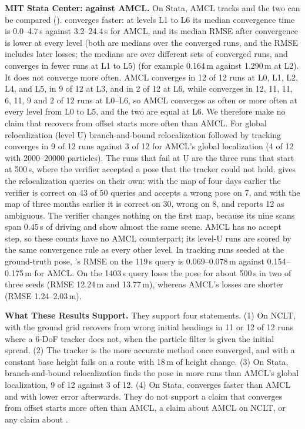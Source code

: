 \noindent\textbf{MIT Stata Center:  against AMCL.} On Stata, AMCL tracks and the two can be compared ().  converges faster: at levels L1 to L6 its median convergence time is 0.0--4.7\,s against 3.2--24.4\,s for AMCL, and its median RMSE after convergence is lower at every level (both are medians over the converged runs, and the RMSE includes later losses; the medians are over different sets of converged runs, and  converges in fewer runs at L1 to L5) (for example 0.164\,m against 1.290\,m at L2). It does not converge more often. AMCL converges in 12 of 12 runs at L0, L1, L2, L4, and L5, in 9 of 12 at L3, and in 2 of 12 at L6, while  converges in 12, 11, 11, 6, 11, 9 and 2 of 12 runs at L0--L6, so AMCL converges as often or more often at every level from L0 to L5, and the two are equal at L6. We therefore make no claim that  recovers from offset starts more often than AMCL. For global relocalization (level U) branch-and-bound relocalization followed by tracking converges in 9 of 12 runs against 3 of 12 for AMCL's global localization (4 of 12 with 2000--20000 particles). The  runs that fail at U are the three runs that start at 500\,s, where the verifier accepted a pose that the tracker could not hold.  gives the relocalization queries on their own: with the map of four days earlier the verifier is correct on 43 of 50 queries and accepts a wrong pose on 7, and with the map of three months earlier it is correct on 30, wrong on 8, and reports 12 as ambiguous. The verifier changes nothing on the first map, because its nine scans span 0.45\,s of driving and show almost the same scene. AMCL has no accept step, so these counts have no AMCL counterpart; its level-U runs are scored by the same convergence rule as every other level. In tracking runs seeded at the ground-truth pose, 's RMSE on the 119\,s query is 0.069--0.078\,m against 0.154--0.175\,m for AMCL. On the 1403\,s query  loses the pose for about 500\,s in two of three seeds (RMSE 12.24\,m and 13.77\,m), whereas AMCL's losses are shorter (RMSE 1.24--2.03\,m).

\noindent\textbf{What These Results Support.} They support four statements. (1) On NCLT,  with the ground grid recovers from wrong initial headings in 11 or 12 of 12 runs where a 6-DoF tracker does not, when the particle filter is given the initial spread. (2) The tracker is the more accurate method once converged, and  with a constant base height fails on a route with 18\,m of height change. (3) On Stata, branch-and-bound relocalization finds the pose in more runs than AMCL's global localization, 9 of 12 against 3 of 12. (4) On Stata,  converges faster than AMCL and with lower error afterwards. They do not support a claim that  converges from offset starts more often than AMCL, a claim about AMCL on NCLT, or any claim about .
